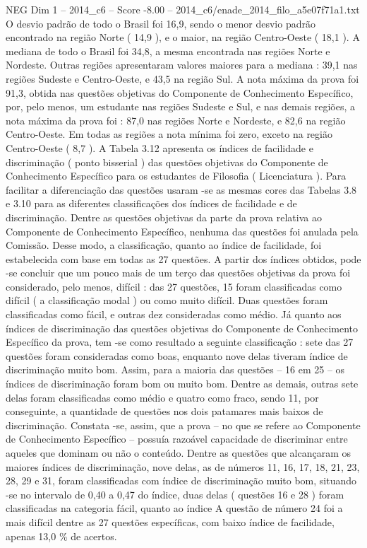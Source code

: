 \begin{textsample}{NEG Dim 1 – 2014\_c6 – Score -8.00 – 2014\_c6/enade\_2014\_filo\_a5e07f71a1.txt}
O desvio padrão de todo o Brasil foi 16,9, sendo o menor desvio padrão encontrado na região Norte ( 14,9 ), e o maior, na região Centro-Oeste ( 18,1 ).
A mediana de todo o Brasil foi 34,8, a mesma encontrada nas regiões Norte e Nordeste.
Outras regiões apresentaram valores maiores para a mediana : 39,1 nas regiões Sudeste e Centro-Oeste, e 43,5 na região Sul.
A nota máxima da prova foi 91,3, obtida nas questões objetivas do Componente de Conhecimento Específico, por, pelo menos, um estudante nas regiões Sudeste e Sul, e nas demais regiões, a nota máxima da prova foi : 87,0 nas regiões Norte e Nordeste, e 82,6 na região Centro-Oeste.
Em todas as regiões a nota mínima foi zero, exceto na região Centro-Oeste ( 8,7 ).
A Tabela 3.12 apresenta os índices de facilidade e discriminação ( ponto bisserial ) das questões objetivas do Componente de Conhecimento Específico para os estudantes de Filosofia ( Licenciatura ).
Para facilitar a diferenciação das questões usaram -se as mesmas cores das Tabelas 3.8 e 3.10 para as diferentes classificações dos índices de facilidade e de discriminação.
Dentre as questões objetivas da parte da prova relativa ao Componente de Conhecimento Específico, nenhuma das questões foi anulada pela Comissão.
Desse modo, a classificação, quanto ao índice de facilidade, foi estabelecida com base em todas as 27 questões.
A partir dos índices obtidos, pode -se concluir que um pouco mais de um terço das questões objetivas da prova foi considerado, pelo menos, difícil : das 27 questões, 15 foram classificadas como difícil ( a classificação modal ) ou como muito difícil.
Duas questões foram classificadas como fácil, e outras dez consideradas como médio.
Já quanto aos índices de discriminação das questões objetivas do Componente de Conhecimento Específico da prova, tem -se como resultado a seguinte classificação : sete das 27 questões foram consideradas como boas, enquanto nove delas tiveram índice de discriminação muito bom.
Assim, para a maioria das questões – 16 em 25 – os índices de discriminação foram bom ou muito bom.
Dentre as demais, outras sete delas foram classificadas como médio e quatro como fraco, sendo 11, por conseguinte, a quantidade de questões nos dois patamares mais baixos de discriminação.
Constata -se, assim, que a prova – no que se refere ao Componente de Conhecimento Específico – possuía razoável capacidade de discriminar entre aqueles que dominam ou não o conteúdo.
Dentre as questões que alcançaram os maiores índices de discriminação, nove delas, as de números 11, 16, 17, 18, 21, 23, 28, 29 e 31, foram classificadas com índice de discriminação muito bom, situando -se no intervalo de 0,40 a 0,47 do índice, duas delas ( questões 16 e 28 ) foram classificadas na categoria fácil, quanto ao índice A questão de número 24 foi a mais difícil dentre as 27 questões específicas, com baixo índice de facilidade, apenas 13,0 \% de acertos.

\end{textsample}
